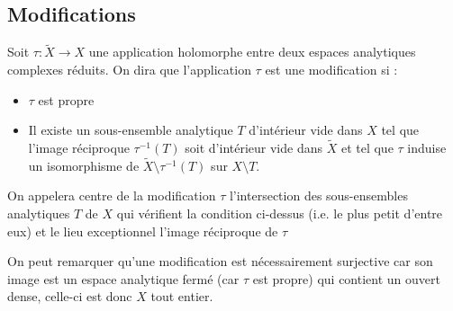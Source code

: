 \documentclass[a4page,10pt]{article}
\begin{document}
\subsection{Modifications}
\begin{Def}
  Soit $\tau : \widetilde{X} \to X$ une application holomorphe entre deux espaces analytiques complexes r\'eduits. On dira que l'application $\tau$ est une modification si :
  \begin{itemize}
  \item $\tau$ est propre
    \item Il existe un sous-ensemble analytique $T$ d'int\'erieur vide dans $X$ tel que l'image r\'eciproque $\tau^{-1}(T)$ soit d'int\'erieur vide dans $\widetilde{X}$ et tel que $\tau$ induise un isomorphisme de $\widetilde{X}\setminus \tau^{-1}(T)$ sur $X \setminus T$. 
    \end{itemize}
On appelera centre de la modification $\tau$ l'intersection des sous-ensembles analytiques $T$ de $X$ qui v\'erifient la condition ci-dessus (i.e. le plus petit d'entre eux) et le lieu exceptionnel l'image r\'eciproque de $\tau$  
\end{Def}

On peut remarquer qu'une modification est n\'ecessairement surjective car son image est un espace analytique ferm\'e (car $\tau$ est propre) qui contient un ouvert dense, celle-ci est donc $X$ tout entier.
\end{document}
